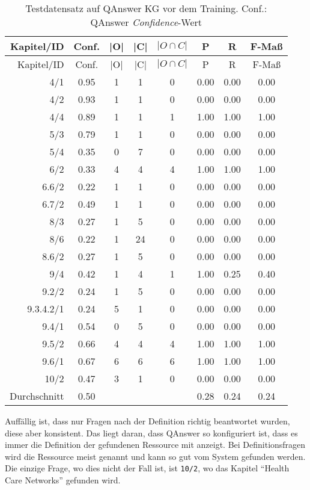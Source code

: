 \begin{longtable}{r c c c c c c c}
  \caption[Testdatensatz QAnswer vor Training]{Testdatensatz auf QAnswer KG vor dem Training.
  Conf.: QAnswer \emph{Confidence}-Wert}
  \label{tab:qanswervortraining}
  \\
  \toprule
  Kapitel/ID    & Conf. & |O|   & |C|   & $|O \cap C|$  & P     & R     & F-Maß   \\
  \midrule
  \endfirsthead
  \toprule
  Kapitel/ID    & Conf. & |O|   & |C|   & $|O \cap C|$  & P     & R     & F-Maß   \\
  \midrule
  \endhead
	4/1			& 0.95 & 1 & 1  & 0 & 0.00 & 0.00 & 0.00 \\
	4/2			& 0.93 & 1 & 1  & 0 & 0.00 & 0.00 & 0.00 \\
	4/4			& 0.89 & 1 & 1  & 1 & 1.00 & 1.00 & 1.00 \\
	5/3			& 0.79 & 1 & 1  & 0 & 0.00 & 0.00 & 0.00 \\
	5/4			& 0.35 & 0 & 7  & 0 & 0.00 & 0.00 & 0.00 \\
	6/2			& 0.33 & 4 & 4  & 4 & 1.00 & 1.00 & 1.00 \\
	6.6/2		& 0.22 & 1 & 1  & 0 & 0.00 & 0.00 & 0.00 \\
	6.7/2		& 0.49 & 1 & 1  & 0 & 0.00 & 0.00 & 0.00 \\
	8/3			& 0.27 & 1 & 5  & 0 & 0.00 & 0.00 & 0.00 \\
	8/6			& 0.22 & 1 & 24 & 0 & 0.00 & 0.00 & 0.00 \\
	8.6/2		& 0.27 & 1 & 5  & 0 & 0.00 & 0.00 & 0.00 \\
	9/4			& 0.42 & 1 & 4  & 1 & 1.00 & 0.25 & 0.40 \\
	9.2/2		& 0.24 & 1 & 5  & 0 & 0.00 & 0.00 & 0.00 \\
	9.3.4.2/1	& 0.24 & 5 & 1  & 0 & 0.00 & 0.00 & 0.00 \\
	9.4/1		& 0.54 & 0 & 5  & 0 & 0.00 & 0.00 & 0.00 \\
	9.5/2		& 0.66 & 4 & 4  & 4 & 1.00 & 1.00 & 1.00 \\
	9.6/1		& 0.67 & 6 & 6  & 6 & 1.00 & 1.00 & 1.00 \\
	10/2		& 0.47 & 3 & 1  & 0 & 0.00 & 0.00 & 0.00 \\
  \midrule
  Durchschnitt  & 0.50 &  &    &   & 0.28 & 0.24 & 0.24 \\
  \bottomrule
\end{longtable}

Auffällig ist, dass nur Fragen nach der Definition richtig beantwortet wurden, diese aber konsistent.
Das liegt daran, dass QAnswer so konfiguriert ist, dass es immer die Definition der gefundenen Ressource mit anzeigt.
Bei Definitionsfragen wird die Ressource meist genannt und kann so gut vom System gefunden werden.
Die einzige Frage, wo dies nicht der Fall ist, ist \texttt{10/2}, wo das Kapitel \enquote{Health Care Networks} gefunden wird.


